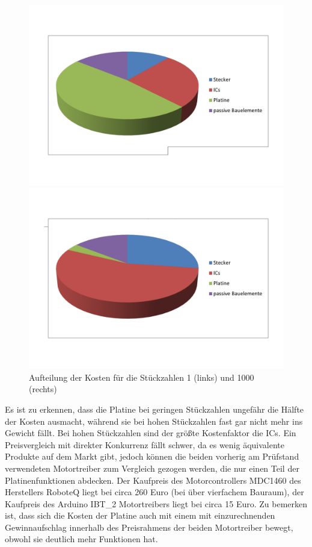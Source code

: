 \begin{figure}[h]
\begin{minipage}[h]{0.5\textwidth}
\includegraphics[width=\textwidth]{./Bilder/Platinenkosten.pdf}
\end{minipage}
\begin{minipage}[h]{0.5\textwidth}
\includegraphics[width=\textwidth]{./Bilder/Platinenkosten-tausend.pdf}
\end{minipage}
\caption{Aufteilung der Kosten für die Stückzahlen 1 (links) und 1000 (rechts)}
	\label{fig:LDO}
\end{figure}

Es ist zu erkennen, dass die Platine bei geringen Stückzahlen ungefähr die Hälfte der Kosten ausmacht, während sie bei hohen Stückzahlen fast gar nicht mehr ins Gewicht fällt. Bei hohen Stückzahlen sind der größte Kostenfaktor die ICs. 
Ein Preisvergleich mit direkter Konkurrenz fällt schwer, da es wenig äquivalente Produkte auf dem Markt gibt, jedoch können die beiden vorherig am Prüfstand verwendeten Motortreiber zum Vergleich gezogen werden, die nur einen Teil der Platinenfunktionen abdecken. Der Kaufpreis des Motorcontrollers MDC1460 des Herstellers RoboteQ liegt bei circa 260 Euro (bei über vierfachem Bauraum), der Kaufpreis des Arduino IBT\_2 Motortreibers liegt bei circa 15 Euro. Zu bemerken ist, dass sich die Kosten der Platine auch mit einem mit einzurechnenden Gewinnaufschlag innerhalb des Preisrahmens der beiden Motortreiber bewegt, obwohl sie deutlich mehr Funktionen hat.

